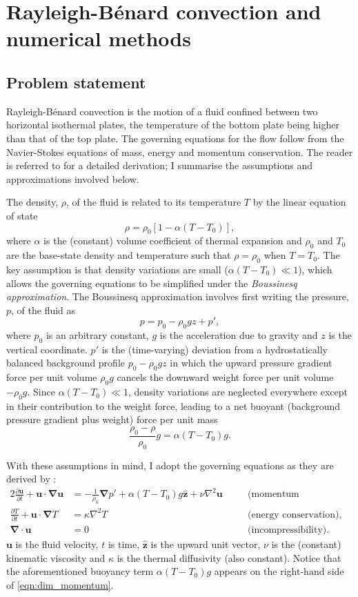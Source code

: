 \documentclass[titlepage]{article}
\numberwithin{equation}{section}
\newcommand{\pdiff}[2]{\frac{\partial #1}{\partial #2}}
\renewcommand\vec{\bm}
\newcommand{\uvec}[1]{\vec{\hat{#1}}}
\newcommand{\grad}{\vec{\nabla}}
\newcommand{\rb}{Rayleigh-B\'{e}nard}
\begin{document}
\newpage
\section{\rb{} convection and numerical methods}
\subsection{Problem statement}
\rb{} convection is the motion of a fluid confined between two
horizontal isothermal plates, the temperature of the bottom plate being
higher than that of the top plate. The governing equations for the flow
follow from the Navier-Stokes equations of mass, energy and momentum
conservation. The reader is referred to \textcite{chandrasekhar1961} for
a detailed derivation; I summarise the assumptions and approximations
involved below.

The density, $\rho$, of the fluid is related to its temperature $T$ by
the linear equation of state
\[
    \rho = \rho_0 [1 - \alpha(T - T_0)],
\]
where $\alpha$ is the (constant) volume coefficient of thermal expansion and
$\rho_0$ and $T_0$ are the base-state density and temperature such that $\rho =
\rho_0$ when $T = T_0$. The key assumption is that density variations are small
($\alpha (T - T_0) \ll 1$), which allows the governing equations to be
simplified under the \emph{Boussinesq approximation}. The Boussinesq
approximation involves first writing the pressure, $p$, of the fluid as
\[
    p = p_0 - \rho_0 gz + p',
\]
where $p_0$ is an arbitrary constant, $g$ is the acceleration due to gravity
and $z$ is the vertical coordinate. $p'$ is the (time-varying) deviation from
a hydrostatically balanced background profile $p_0 - \rho_0 gz$
in which the upward pressure gradient force per unit volume $\rho_0 g$ cancels
the downward weight force per unit volume $-\rho_0 g$. Since
$\alpha (T - T_0) \ll 1$, density variations are neglected everywhere except
in their contribution to the weight force, leading to a net buoyant
(background pressure gradient plus weight) force per unit mass
\[
    \frac{\rho_0 - \rho}{\rho_0} g = \alpha (T - T_0) g.
\]

With these assumptions in mind, I adopt the governing equations as they
are derived by \textcite{chandrasekhar1961}:
\begin{alignat}{2}
    \label{eqn:dim_momentum}
    \pdiff{\vec{u}}{t} + \vec{u} \cdot \grad \vec{u}
        &= -\frac{1}{\rho_0} \grad p' + \alpha (T - T_0) g \uvec{z}
        + \nu \nabla^2 \vec{u}
    &\quad& \text{(momentum conservation),} \\
    \label{eqn:dim_energy}
    \pdiff{T}{t} + \vec{u} \cdot \grad T
        &= \kappa \nabla^2 T
    && \text{(energy conservation), and} \\
    \label{eqn:dim_incompressible}
    \grad \cdot \vec{u} &= 0
    && \text{(incompressibility).}
\end{alignat}
$\vec{u}$ is the fluid velocity, $t$ is time, $\uvec{z}$ is the upward
unit vector, $\nu$ is the (constant) kinematic viscosity and $\kappa$ is
the thermal diffusivity (also constant). Notice that the aforementioned
buoyancy term $\alpha (T - T_0) g$ appears on the right-hand side of
\cref{eqn:dim_momentum}.
\end{document}
